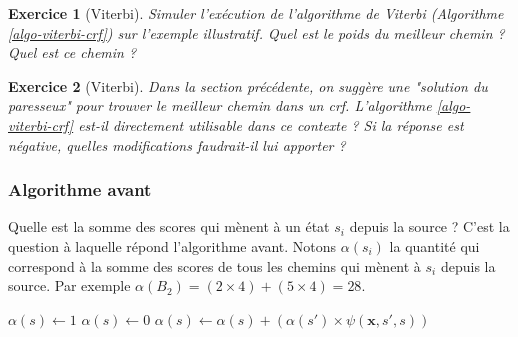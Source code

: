 \documentclass[11pt,openany]{book}
\newtheorem{exo}{Exercice}[chapter]
\newcommand{\ac}[1]{{\sc #1}} %
\begin{document}
\begin{algorithm}[htbp]
\caption{\label{algo-viterbi-crf}Algorithme de Viterbi pour \ac{crf}}
\end{algorithm}
 
\begin{exo}[Viterbi]
Simuler l'exécution de l'algorithme de Viterbi (Algorithme \ref{algo-viterbi-crf}) sur l'exemple illustratif. Quel est le poids du meilleur chemin ? Quel est ce chemin ? 
\end{exo}

\begin{exo}[Viterbi]
Dans la section précédente, on suggère une "solution du paresseux" pour trouver le meilleur chemin dans un \ac{crf}.  L'algorithme \ref{algo-viterbi-crf} est-il directement utilisable dans ce contexte ? Si la réponse est négative, quelles modifications faudrait-il lui apporter ?
\end{exo}




\subsubsection{Algorithme avant} Quelle est la somme des scores qui mènent à un état $s_i$ depuis la source ? C'est la question à laquelle répond l'algorithme avant.
Notons $\alpha(s_i)$ la quantité qui correspond à la somme des scores de tous les chemins qui mènent à $s_i$ depuis la source. Par exemple $\alpha(B_2) = (2) + (5) = 28$.


\begin{algorithm}[htbp]
\begin{algorithmic}
\State {}
\State $\alpha(s) $
\State $\alpha(s) $
\State  $\alpha(s) \gets \alpha(s) + (\alpha(s')  \times \psi(,s',s) ) $
\EndFor
\EndFor
\EndFunction
\end{algorithmic}
\caption{\label{algo-forward}Algorithme Avant}
\end{algorithm}
\end{document}
